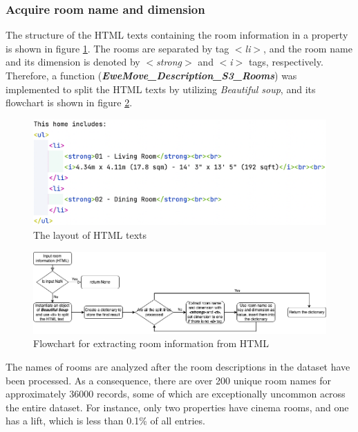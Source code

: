 \documentclass[12pt,twoside]{report}
\begin{document}
\subsubsection{Acquire room name and dimension}
The structure of the HTML texts containing the room information in a property is shown in figure \ref{html_structure}. The rooms are separated by tag \textit{$<$li$>$}, and the room name and its dimension is denoted by \textit{$<$strong$>$} and \textit{$<$i$>$} tags, respectively. Therefore, a function (\textit{\textbf{EweMove\_Description\_S3\_Rooms}}) was implemented to split the HTML texts by utilizing \textit{Beautiful soup}, and its flowchart is shown in figure \ref{html_room_info}.
\begin{figure}[h]
	\centering
	\includegraphics[width=15cm]{html_structure}
	\caption{The layout of HTML texts}
	\label{html_structure}
\end{figure}

\begin{figure}[h]
	\centering
	\includegraphics[width=1\linewidth]{html_room_info}
	\caption{Flowchart for extracting room information from HTML}
	\label{html_room_info}
\end{figure}

The names of rooms are analyzed after the room descriptions in the dataset have been processed. As a consequence, there are over 200 unique room names for approximately 36000 records, some of which are exceptionally uncommon across the entire dataset. For instance, only two properties have cinema rooms, and one has a lift, which is less than 0.1\% of all entries.  
\\
\end{document}
